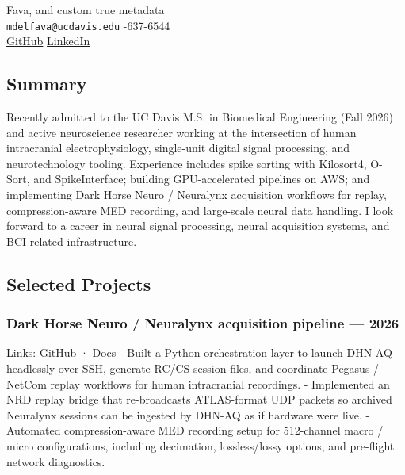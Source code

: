 \documentclass[11pt]{article}
\newcommand{\namefontsize}{25pt}
\newcommand{\ResumeName}[1]{\vspace*{-0.5em}\noindent{\sffamily\bfseries\fontsize{\namefontsize}{0}\selectfont #1}\vspace{0.2em}\\}
\begin{document}
\pagestyle{plain}

Fava, and custom true metadata
  \ResumeName{Marco Del Fava}
      \noindent\small\texttt{mdelfava@ucdavis.edu} -637-6544 \\
    \href{https://github.com/BarkBarkBarkBarkBarkBarkBark}{GitHub}\quad 
    \href{www.linkedin.com/in/marc-del-fava}{LinkedIn}\quad 
  
\subsection{Summary}\label{summary}

Recently admitted to the UC Davis M.S. in Biomedical Engineering (Fall
2026) and active neuroscience researcher working at the intersection of
human intracranial electrophysiology, single-unit digital signal
processing, and neurotechnology tooling. Experience includes spike
sorting with Kilosort4, O-Sort, and SpikeInterface; building
GPU-accelerated pipelines on AWS; and implementing Dark Horse Neuro /
Neuralynx acquisition workflows for replay, compression-aware MED
recording, and large-scale neural data handling. I look forward to a
career in neural signal processing, neural acquisition systems, and
BCI-related infrastructure.

\subsection{Selected Projects}\label{selected-projects}

\subsubsection{Dark Horse Neuro / Neuralynx acquisition pipeline ---
2026}\label{dark-horse-neuro-neuralynx-acquisition-pipeline-2026}

Links:
\href{https://github.com/BarkBarkBarkBarkBarkBarkBark/dhn_client}{GitHub}
·
\href{https://barkbarkbarkbarkbarkbarkbark.github.io/dhn_client/}{Docs}
- Built a Python orchestration layer to launch DHN-AQ headlessly over
SSH, generate RC/CS session files, and coordinate Pegasus / NetCom
replay workflows for human intracranial recordings. - Implemented an NRD
replay bridge that re-broadcasts ATLAS-format UDP packets so archived
Neuralynx sessions can be ingested by DHN-AQ as if hardware were live. -
Automated compression-aware MED recording setup for 512-channel macro /
micro configurations, including decimation, lossless/lossy options, and
pre-flight network diagnostics.
\end{document}
